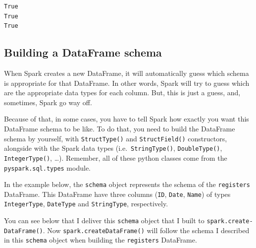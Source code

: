 \documentclass[
  11pt,
  letterpaper,
  DIV=11,
  numbers=noendperiod]{scrreprt}
\begin{document}
\begin{verbatim}
True
True
True
\end{verbatim}

\subsection{Building a DataFrame
schema}\label{building-a-dataframe-schema}

When Spark creates a new DataFrame, it will automatically guess which
schema is appropriate for that DataFrame. In other words, Spark will try
to guess which are the appropriate data types for each column. But, this
is just a guess, and, sometimes, Spark go way off.

Because of that, in some cases, you have to tell Spark how exactly you
want this DataFrame schema to be like. To do that, you need to build the
DataFrame schema by yourself, with \texttt{StructType()} and
\texttt{StructField()} constructors, alongside with the Spark data types
(i.e.~\texttt{StringType()}, \texttt{DoubleType()},
\texttt{IntegerType()}, \ldots). Remember, all of these python classes
come from the \texttt{pyspark.sql.types} module.

In the example below, the \texttt{schema} object represents the schema
of the \texttt{registers} DataFrame. This DataFrame have three columns
(\texttt{ID}, \texttt{Date}, \texttt{Name}) of types
\texttt{IntegerType}, \texttt{DateType} and \texttt{StringType},
respectively.

You can see below that I deliver this \texttt{schema} object that I
built to \texttt{spark.create-DataFrame()}. Now
\texttt{spark.createDataFrame()} will follow the schema I described in
this \texttt{schema} object when building the \texttt{registers}
DataFrame.
\end{document}
